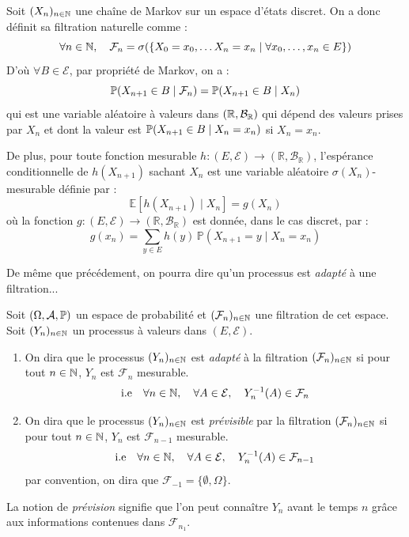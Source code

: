 \begin{remark}
    Soit $(X_n)_{n \in \mathbb{N}}$ une chaîne de Markov sur un espace d'états discret. On a donc définit 
    sa filtration naturelle comme : 
        $$ \forall n \in \mathbb{N}, \quad \mathcal{F}_n = \sigma(\{X_0 = x_0, \dots X_n = x_n \mid \forall x_0, \dots, x_n \in E\}) $$ 
    D'où $ \forall B \in \mathcal{E}$, par propriété de Markov, on a : 
        $$ \mathbb{P}(X_{n+1} \in B \mid \mathcal{F}_n) = \mathbb{P}(X_{n+1} \in B \mid X_n) $$ 
    qui est une variable aléatoire à valeurs dans $ (\mathbb{R}, \mathcal{B}_{\mathbb{R}})$ qui dépend des valeurs prises par $ X_n$ 
    et dont la valeur est $\mathbb{P}(X_{n+1} \in B \mid X_n = x_n)$ si $X_n = x_n$. 

    De plus, pour toute fonction mesurable $h : (E, \mathcal{E}) \to (\mathbb{R}, \mathcal{B}_\mathbb{R})$, 
    l'espérance conditionnelle de $h(X_{n+1})$ sachant $X_n$ est une variable aléatoire $\sigma(X_n)$-mesurable définie 
    par :
        $$ \mathbb{E}[h(X_{n+1}) \mid X_n] = g(X_n) $$
    où la fonction $g : (E, \mathcal{E}) \to (\mathbb{R}, \mathcal{B}_\mathbb{R})$ est donnée, dans le cas discret, par :
        $$ g(x_n) = \sum_{y \in E} h(y)\, \mathbb{P}(X_{n+1} = y \mid X_n = x_n) $$
\end{remark}

De même que précédement, on pourra dire qu'un processus est \emph{adapté} à une filtration... 

\begin{definition}
    Soit $( \Omega, \mathcal{A}, \mathbb{P})$ un espace de probabilité et $( \mathcal{F}_n)_{n \in \mathbb{N}}$ une filtration de cet espace. 
    Soit $(Y_n)_{n \in \mathbb{N}}$ un processus à valeurs dans $(E, \mathcal{E})$. 
    \begin{enumerate}[label={\roman*)}]
        \item  On dira que le processus $(Y_n)_{n \in \mathbb{N}}$ est \emph{adapté} à la filtration 
        $( \mathcal{F}_n)_{n \in \mathbb{N}}$ si pour tout $n \in \mathbb{N}$, $Y_n$ est $ \mathcal{F}_n$ mesurable. 
                $$ \text{i.e} \quad \forall n \in \mathbb{N}, \quad \forall A \in \mathcal{E}, \quad Y_n^{-1}(A) \in \mathcal{F}_n $$
        \item On dira que le processus $(Y_n)_{n \in \mathbb{N}}$ est \emph{prévisible} par la filtration 
        $( \mathcal{F}_n)_{n \in \mathbb{N}}$ si pour tout $n \in \mathbb{N}$, $Y_n$ est $ \mathcal{F}_{n-1}$ mesurable. 
            $$ \text{i.e} \quad \forall n \in \mathbb{N}, \quad \forall A \in \mathcal{E}, \quad Y_n^{-1}(A) \in \mathcal{F}_{n-1} $$
        par convention, on dira que $ \mathcal{F}_{-1} = \{ \emptyset, \Omega\}$. 
    \end{enumerate}
    La notion de \emph{prévision} signifie que l'on peut connaître $Y_n$ avant le temps $n$ grâce 
    aux informations contenues dans $ \mathcal{F}_{n_1}$. 
\end{definition}

